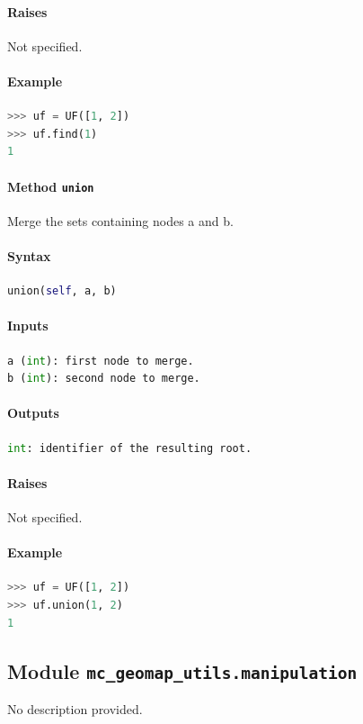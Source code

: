 \documentclass[11pt]{article}
\begin{document}
\paragraph{Raises}
Not specified.
\paragraph{Example}
\begin{lstlisting}[language=Python]
>>> uf = UF([1, 2])
>>> uf.find(1)
1
\end{lstlisting}

\paragraph{Method \texttt{union}}
Merge the sets containing nodes a and b.

\paragraph{Syntax}
\begin{lstlisting}[language=Python]
union(self, a, b)
\end{lstlisting}
\paragraph{Inputs}
\begin{lstlisting}[language=Python]
a (int): first node to merge.
b (int): second node to merge.
\end{lstlisting}
\paragraph{Outputs}
\begin{lstlisting}[language=Python]
int: identifier of the resulting root.
\end{lstlisting}
\paragraph{Raises}
Not specified.
\paragraph{Example}
\begin{lstlisting}[language=Python]
>>> uf = UF([1, 2])
>>> uf.union(1, 2)
1
\end{lstlisting}

\subsection{Module \texttt{mc\_geomap\_utils.manipulation}}
No description provided.
\end{document}
